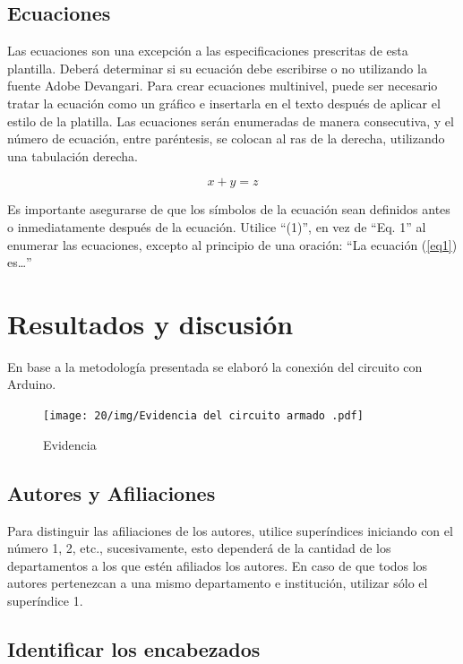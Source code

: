     \subsection{Ecuaciones}
    
    Las ecuaciones son una excepción a las especificaciones prescritas de esta plantilla. 
    Deberá determinar si su ecuación debe escribirse o no utilizando la fuente Adobe Devangari. 
    Para crear ecuaciones multinivel, puede ser necesario tratar la ecuación como un gráfico e insertarla en el texto después de aplicar el estilo de la platilla.
    Las ecuaciones serán enumeradas de manera consecutiva, y el número de ecuación, entre paréntesis, se colocan al ras de la derecha, utilizando una tabulación derecha. 
    
    \begin{equation}
        \label{eq1}
        x + y = z 
    \end{equation}
    
    Es importante asegurarse de que los símbolos de la ecuación sean definidos antes o inmediatamente después de la ecuación. Utilice “(1)”, en vez de “Eq. 1” al enumerar las ecuaciones, excepto al principio de una oración: “La ecuación (\ref{eq1}) es…”
    
    \section{Resultados y discusión}
    
    En base a la metodología presentada se elaboró la conexión del circuito con Arduino.
    \begin{figure}[H]
        \centering
        \texttt{[image: 20/img/Evidencia del circuito armado .pdf]}
        \caption{Evidencia}
        \label{fig:Evidencia del circuito armado .pdf}
    \end{figure}
    
    \subsection{Autores y Afiliaciones}
    
    Para distinguir las afiliaciones de los autores, utilice superíndices iniciando con el número 1, 2, etc., sucesivamente, esto dependerá de la cantidad de los departamentos a los que estén afiliados los autores. En caso de que todos los autores pertenezcan a una mismo departamento e institución, utilizar sólo el superíndice 1. 
    
    \subsection{Identificar los encabezados}
    
